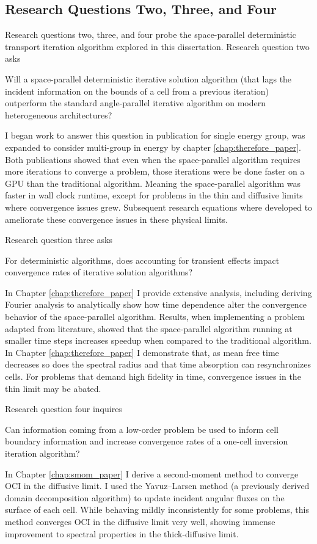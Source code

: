 \subsection{Research Questions Two, Three, and Four}

Research questions two, three, and four probe the space-parallel deterministic transport iteration algorithm explored in this dissertation.
Research question two asks
\begin{displayquote}
Will a space-parallel deterministic iterative solution algorithm (that lags the incident information on the bounds of a cell from a previous iteration) outperform the standard angle-parallel iterative algorithm on modern heterogeneous architectures?
\end{displayquote}
I began work to answer this question in publication \cite{morgan2023oci} for single energy group, was expanded to consider multi-group in energy by chapter \ref{chap:therefore_paper}.
Both publications showed that even when the space-parallel algorithm requires more iterations to converge a problem, those iterations were be done faster on a GPU than the traditional algorithm.
Meaning the space-parallel algorithm was faster in wall clock runtime, except for problems in the thin and diffusive limits where convergence issues grew.
Subsequent research equations where developed to ameliorate these convergence issues in these physical limits.

Research question three asks
\begin{displayquote}
For deterministic algorithms, does accounting for transient effects impact convergence rates of iterative solution algorithms?
\end{displayquote}
In Chapter \ref{chap:therefore_paper} I provide extensive analysis, including deriving Fourier analysis to analytically show how time dependence alter the convergence behavior of the space-parallel algorithm.
Results, when implementing a problem adapted from literature, showed that the space-parallel algorithm running at smaller time steps increases speedup when compared to the traditional algorithm.
In Chapter \ref{chap:therefore_paper} I demonstrate that, as mean free time decreases so does the spectral radius and that time absorption can resynchronizes cells.
For problems that demand high fidelity in time, convergence issues in the thin limit may be abated.

Research question four inquires
\begin{displayquote}
Can information coming from a low-order problem be used to inform cell boundary information and increase convergence rates of a one-cell inversion iteration algorithm?
\end{displayquote}
In Chapter \ref{chap:smom_paper} I derive a second-moment method to converge OCI in the diffusive limit.
I used the Yavuz--Larsen method (a previously derived domain decomposition algorithm) to update incident angular fluxes on the surface of each cell.
While behaving mildly inconsistently for some problems, this method converges OCI in the diffusive limit very well, showing immense improvement to spectral properties in the thick-diffusive limit.


